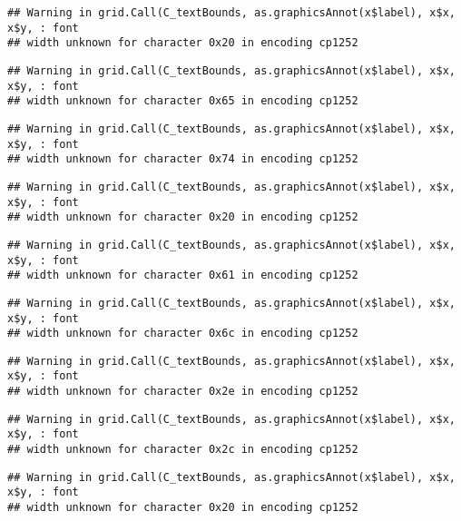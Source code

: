 \documentclass[
]{article}
\begin{document}
\begin{verbatim}
## Warning in grid.Call(C_textBounds, as.graphicsAnnot(x$label), x$x, x$y, : font
## width unknown for character 0x20 in encoding cp1252
\end{verbatim}

\begin{verbatim}
## Warning in grid.Call(C_textBounds, as.graphicsAnnot(x$label), x$x, x$y, : font
## width unknown for character 0x65 in encoding cp1252
\end{verbatim}

\begin{verbatim}
## Warning in grid.Call(C_textBounds, as.graphicsAnnot(x$label), x$x, x$y, : font
## width unknown for character 0x74 in encoding cp1252
\end{verbatim}

\begin{verbatim}
## Warning in grid.Call(C_textBounds, as.graphicsAnnot(x$label), x$x, x$y, : font
## width unknown for character 0x20 in encoding cp1252
\end{verbatim}

\begin{verbatim}
## Warning in grid.Call(C_textBounds, as.graphicsAnnot(x$label), x$x, x$y, : font
## width unknown for character 0x61 in encoding cp1252
\end{verbatim}

\begin{verbatim}
## Warning in grid.Call(C_textBounds, as.graphicsAnnot(x$label), x$x, x$y, : font
## width unknown for character 0x6c in encoding cp1252
\end{verbatim}

\begin{verbatim}
## Warning in grid.Call(C_textBounds, as.graphicsAnnot(x$label), x$x, x$y, : font
## width unknown for character 0x2e in encoding cp1252
\end{verbatim}

\begin{verbatim}
## Warning in grid.Call(C_textBounds, as.graphicsAnnot(x$label), x$x, x$y, : font
## width unknown for character 0x2c in encoding cp1252
\end{verbatim}

\begin{verbatim}
## Warning in grid.Call(C_textBounds, as.graphicsAnnot(x$label), x$x, x$y, : font
## width unknown for character 0x20 in encoding cp1252
\end{verbatim}
\end{document}
